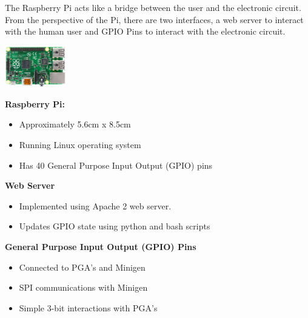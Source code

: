 \documentclass[25pt, a0paper, portrait, margin=0mm, innermargin=15mm, blockverticalspace=15mm, colspace=15mm, subcolspace=8mm]{tikzposter}
\begin{document}
\begin{columns}
{\begin{multicols}{2}
The Raspberry Pi acts like a bridge between the user and the electronic circuit.
From the perspective of the Pi,
there are two interfaces,
a web server to interact with the human user and
GPIO Pins to interact with the electronic circuit.

\begin{center}
\includegraphics[width=0.2\textwidth,keepaspectratio]{rpi_real.png}
\end{center}

\textbf{Raspberry Pi:}
\begin{itemize}
\item Approximately 5.6cm x 8.5cm
\item Running Linux operating system
\item Has 40 General Purpose Input Output (GPIO) pins
\end{itemize}

\textbf{Web Server}
\begin{itemize}
\item Implemented using Apache 2 web server.
\item Updates GPIO state using python and bash scripts
\end{itemize}

\textbf{General Purpose Input Output (GPIO) Pins}
\begin{itemize}
\item Connected to PGA's and Minigen
\item SPI communications with Minigen
\item Simple 3-bit interactions with PGA's
\end{itemize}




\end{multicols}}
\end{columns}
\end{document}
